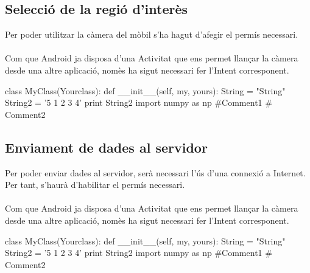 	\subsection{Selecció de la regió d'interès}
		Per poder utilitzar la càmera del mòbil s'ha hagut d'afegir el permís necessari.\\\\
		Com que Android ja disposa d'una Activitat que ens permet llançar la càmera desde una altre aplicació, nomès ha sigut necessari fer l'Intent corresponent.\\
		\begin{python}
class MyClass(Yourclass):
  def __init__(self, my, yours):
    String = "String"
    String2 = '5 1 2 3 4'
    print String2
import numpy as np #Comment1
  # Comment2
		\end{python}
	\subsection{Enviament de dades al servidor}
		Per poder enviar dades al servidor, serà necessari l'ús d'una connexió a Internet. Per tant, s'haurà d'habilitar el permís necessari.\\\\
		Com que Android ja disposa d'una Activitat que ens permet llançar la càmera desde una altre aplicació, nomès ha sigut necessari fer l'Intent corresponent.\\
		\begin{python}
class MyClass(Yourclass):
  def __init__(self, my, yours):
    String = "String"
    String2 = '5 1 2 3 4'
    print String2
import numpy as np #Comment1
  # Comment2
		\end{python}
